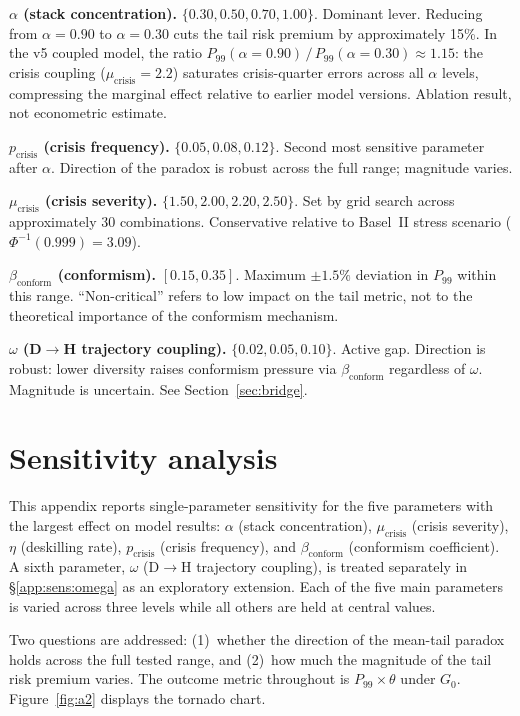 \documentclass[11pt,a4paper]{article}
\begin{document}
\begin{appendices}
\medskip
\textbf{$\alpha$ (stack concentration).}
$\{0.30, 0.50, 0.70, 1.00\}$. Dominant lever. Reducing from $\alpha = 0.90$
to $\alpha = 0.30$ cuts the tail risk premium by approximately 15\%. In the
v5 coupled model, the ratio
$P_{99}(\alpha{=}0.90)\,/\,P_{99}(\alpha{=}0.30) \approx 1.15$: the crisis
coupling ($\mu_{\text{crisis}} = 2.2$) saturates crisis-quarter errors across
all $\alpha$ levels, compressing the marginal effect relative to earlier
model versions. Ablation result, not econometric estimate.

\medskip
\textbf{$p_{\text{crisis}}$ (crisis frequency).}
$\{0.05, 0.08, 0.12\}$. Second most sensitive parameter after $\alpha$.
Direction of the paradox is robust across the full range; magnitude varies.

\medskip
\textbf{$\mu_{\text{crisis}}$ (crisis severity).}
$\{1.50, 2.00, 2.20, 2.50\}$. Set by grid search across approximately 30
combinations. Conservative relative to Basel~II stress scenario
($\Phi^{-1}(0.999) = 3.09$).

\medskip
\textbf{$\beta_{\text{conform}}$ (conformism).}
$[0.15, 0.35]$. Maximum $\pm 1.5\%$ deviation in $P_{99}$ within this
range. ``Non-critical'' refers to low impact on the tail metric, not to the
theoretical importance of the conformism mechanism.

\medskip
\textbf{$\omega$ (D$\rightarrow$H trajectory coupling).}
$\{0.02, 0.05, 0.10\}$. Active gap. Direction is robust: lower diversity
raises conformism pressure via $\beta_{\text{conform}}$ regardless of
$\omega$. Magnitude is uncertain. See Section~\ref{sec:bridge}.

\section{Sensitivity analysis}\label{app:sensitivity}

This appendix reports single-parameter sensitivity for the five parameters
with the largest effect on model results: $\alpha$ (stack concentration),
$\mu_{\text{crisis}}$ (crisis severity), $\eta$ (deskilling rate),
$p_{\text{crisis}}$ (crisis frequency), and $\beta_{\text{conform}}$
(conformism coefficient). A sixth parameter, $\omega$ (D$\rightarrow$H
trajectory coupling), is treated separately in \S\ref{app:sens:omega} as an
exploratory extension. Each of the five main parameters is varied across
three levels while all others are held at central values.

Two questions are addressed: (1)~whether the direction of the mean-tail
paradox holds across the full tested range, and (2)~how much the magnitude
of the tail risk premium varies. The outcome metric throughout is
$P_{99}\times\theta$ under $G_0$. Figure~\ref{fig:a2} displays the tornado
chart.


\end{appendices}
\end{document}
